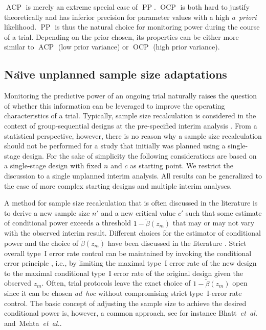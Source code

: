 \documentclass[12pt]{article}
\newcommand{\etal}{\textit{et~al.}}
\newcommand{\ACP}{\ensuremath{\operatorname{ACP}}}
\newcommand{\OCP}{\ensuremath{\operatorname{OCP}}}
\newcommand{\PP}{\ensuremath{\operatorname{PP}}}
\begin{document}
$\ACP$ is merely an extreme special case of $\PP$.
$\OCP$ is both hard to justify theoretically and has inferior precision
for parameter values with a high \textit{a~priori} likelihood.
$\PP$ is thus the natural choice for monitoring power during the course of a trial.
Depending on the prior chosen, its properties can be either more similar to $\ACP$ (low prior variance) or $\OCP$ (high prior variance).



\subsection{Na\"{\i}ve unplanned sample size adaptations}
\label{sec:naive-adaptations}

Monitoring the predictive power of an ongoing trial naturally raises the question of whether this information can be leveraged to improve the operating characteristics of a trial.
Typically, sample size recalculation is considered in the context of group-sequential designs at the pre-specified interim analysis \cite{proschan1995,brannath2004,bauer2016}.
From a statistical perspective, however,
there is no reason why a sample size recalculation should not be
performed for a study that initially was planned using a single-stage design.
For the sake of simplicity the following considerations are based on a single-stage design with fixed $n$ and $c$ as starting point.
We restrict the discussion to a single unplanned interim analysis.
All results can be generalized to the case of more complex starting designs and multiple interim analyses.

A method for sample size recalculation that is often discussed in the literature is to derive a new sample size $n'$ and a new critical value $c'$ such that some estimate of conditional power exceeds a threshold $1-\widetilde{\beta}(z_m)$ that may or may not vary with the observed interim result.
Different choices for the estimator of conditional power
and the choice of $\widetilde{\beta}(z_m)$ have been discussed in the literature \cite{proschan1995,brannath2004,bauer2016}.
Strict overall type~I error rate control can be maintained by invoking the conditional error principle \cite{muller2001,muller2004,brannath2012}, i.e., by limiting the maximal type~I error rate of the new design to the maximal conditional type~I error rate of the original design given the observed $z_m$.
Often, trial protocols leave the exact choice of $1-\widetilde{\beta}(z_m)$ open since it can be chosen \textit{ad~hoc}
without compromising strict type~I-error rate control.
The basic concept of adjusting the sample size to achieve the desired conditional power is, however, a common approach, see for instance Bhatt~\etal~\cite{bhatt2013} and~Mehta~\etal\cite{mehta2009}.
\end{document}
